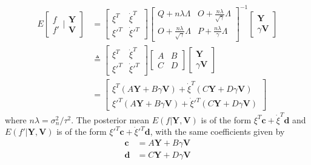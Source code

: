 \begin{align*}
E\left[ \begin{matrix}
f \\
f'
\end{matrix} | \begin{matrix}
\mathbf{Y} \\
\mathbf{V}
\end{matrix}\right] &= 
\left[ \begin{matrix}
\xi^T& \dot{\xi}^T \\
\xi'^T & \dot{\xi}'^T 
\end{matrix} \right] 
\left[ \begin{matrix}
Q+n\lambda \Lambda & O+\frac{n\lambda}{\sqrt{\gamma}}\Lambda\\
 O+\frac{n\lambda}{\sqrt{\gamma}}\Lambda &  P+\frac{n\lambda}{\gamma}\Lambda
\end{matrix} \right] ^{-1}
\left[ 
\begin{matrix}
\mathbf{Y} \\
\gamma \mathbf{V}
\end{matrix} \right] \\
&\triangleq
\left[ \begin{matrix}
\xi^T& \dot{\xi}^T \\
\xi'^T & \dot{\xi}'^T 
\end{matrix} \right] 
\left[ \begin{matrix}
A & B\\
C & D
\end{matrix} \right]
\left[ 
\begin{matrix}
\mathbf{Y} \\
\gamma \mathbf{V}
\end{matrix} \right] \\
&=
\left[ \begin{matrix}
\xi^T(A\mathbf{Y}+B\gamma \mathbf{V})+ \dot{\xi}^T(C\mathbf{Y}+D\gamma \mathbf{V}) \\
\xi'^T(A\mathbf{Y}+B\gamma \mathbf{V})+ \dot{\xi}'^T(C\mathbf{Y}+D\gamma \mathbf{V}) 
\end{matrix} \right] 
\end{align*}
where $n\lambda = \sigma_n^2 / \tau^2$. The posterior mean $E(f | \mathbf{Y},\mathbf{V})$ is of the form $\xi^T \mathbf{c}+\dot{\xi}^T\mathbf{d}$ and $E(f' | \mathbf{Y},\mathbf{V})$ is of the form $\xi'^T \mathbf{c}+\dot{\xi}'^T\mathbf{d}$, with the same coefficients given by
\begin{align*}
\mathbf{c}&=A\mathbf{Y}+B\gamma \mathbf{V}\\
\mathbf{d}&=C\mathbf{Y}+D\gamma \mathbf{V} 
\end{align*}



